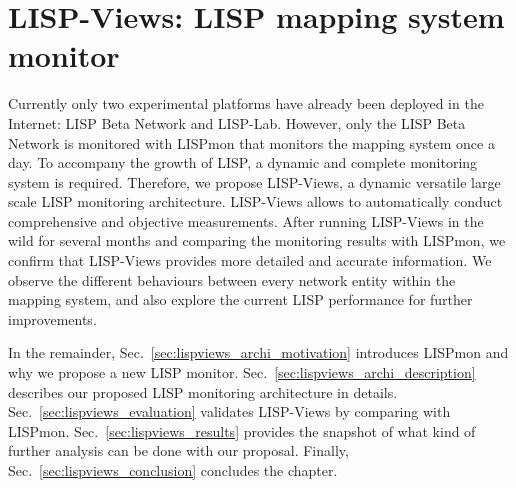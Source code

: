 
\chapter{LISP-Views: LISP mapping system monitor}
\label{cha:LISPViews}

\ifpdf
    \graphicspath{{Chapter5/Pics/Raster/}{Chapter5/Pics/PDF/}{Chapter5/}}
\else
    \graphicspath{{Chapter5/Pics/Vector/}{Chapter5/}}
\fi

Currently only two experimental platforms have already been deployed in the Internet: LISP Beta Network and LISP-Lab. However, only the LISP Beta Network is monitored with LISPmon that monitors the mapping system once a day. To accompany the growth of LISP, a dynamic and complete monitoring system is required. Therefore, we propose LISP-Views, a dynamic versatile large scale LISP monitoring architecture. LISP-Views allows to automatically conduct comprehensive and objective measurements. After running LISP-Views in the wild for several months and comparing the monitoring results with LISPmon, we confirm that LISP-Views provides more detailed and accurate information. We observe the different behaviours between every network entity within the mapping system, and also explore the current LISP performance for further improvements.

In the remainder, Sec.~\ref{sec:lispviews_archi_motivation} introduces LISPmon and why we propose a new LISP monitor. Sec.~\ref{sec:lispviews_archi_description} describes our proposed LISP monitoring architecture in details. Sec.~\ref{sec:lispviews_evaluation} validates LISP-Views by comparing with LISPmon. Sec.~\ref{sec:lispviews_results} provides the snapshot of what kind of further analysis can be done with our proposal. Finally, Sec.~\ref{sec:lispviews_conclusion} concludes the chapter. 


